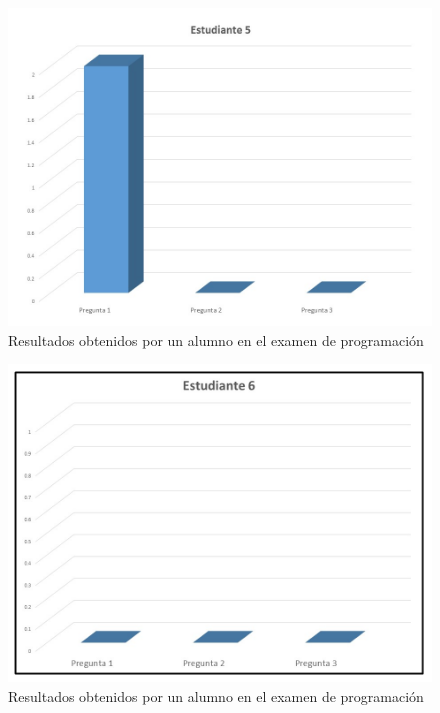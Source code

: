 \documentclass[12pt] {report}
\begin{document}
\begin{figure}[H]
\centering 
\includegraphics[scale=.4]{PEstudiante5.JPG}
\caption{Resultados obtenidos por un alumno en el examen de programación}
\end{figure}

\begin{figure}[H]
\centering 
\includegraphics[scale=.4]{PEstudiante6.JPG}
\caption{Resultados obtenidos por un alumno en el examen de programación}
\end{figure}
\end{document}
